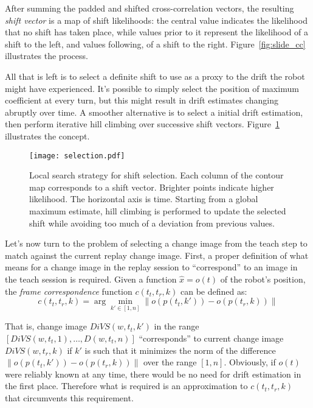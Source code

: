 \documentclass[twocolumn, 9pt,fleqn]{jsproceedings}
\begin{document}
After summing the padded and shifted cross-correlation vectors, the resulting \textit{shift vector} is a map of shift likelihoods: the central value indicates the likelihood that no shift has taken place, while values prior to it represent the likelihood of a shift to the left, and values following, of a shift to the right. Figure~\ref{fig:slide_cc} illustrates the process.

All that is left is to select a definite shift to use as a proxy to the drift the robot might have experienced. It's possible to simply select the position of maximum coefficient at every turn, but this might result in drift estimates changing abruptly over time. A smoother alternative is to select a initial drift estimation, then perform iterative hill climbing over successive shift vectors. Figure~\ref{fig:selection} illustrates the concept.

\begin{figure}[h!]
\texttt{[image: selection.pdf]}
\caption{Local search strategy for shift selection. Each column of the contour map corresponds to a shift vector. Brighter points indicate higher likelihood. The horizontal axis is time. Starting from a global maximum estimate, hill climbing is performed to update the selected shift while avoiding too much of a deviation from previous values.}
\label{fig:selection}
\end{figure}

Let's now turn to the problem of selecting a change image from the teach step to match against the current replay change image. First, a proper definition of what means for a change image in the replay session to ``correspond'' to an image in the teach session is required. Given a function $\hat{x} = o(t)$ of the robot's position, the \textit{frame correspondence} function $c(t_t, t_r, k)$ can be defined as:
\begin{equation}
c(t_t, t_r, k) = \arg \min_{k' \in [1, n]} {\| o(p(t_t, k')) - o(p(t_r, k)) \|}
\end{equation}

That is, change image $DiVS(w, t_t, k')$ in the range $[DiVS(w, t_t, 1), \dotsc, D(w, t_t, n)]$ ``corresponds'' to current change image $DiVS(w, t_r, k)$ if $k'$ is such that it minimizes the norm of the difference $\| o(p(t_t, k')) - o(p(t_r, k)) \|$ over the range $[1, n]$. Obviously, if $o(t)$ were reliably known at any time, there would be no need for drift estimation in the first place. Therefore what is required is an approximation to $c(t_t, t_r, k)$ that circumvents this requirement.
\end{document}
